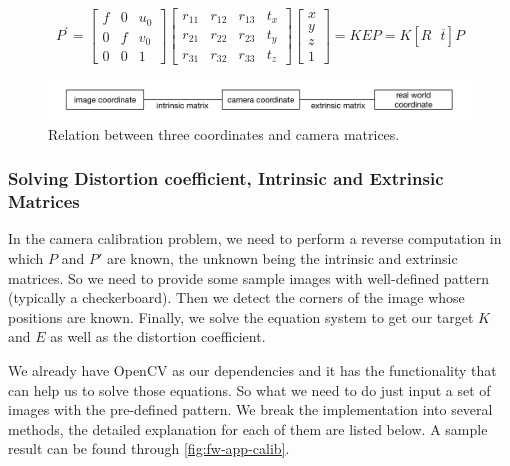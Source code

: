 \begin{equation}
\label{eq:ins-exs-mat}
P^{\prime} = \left[ \begin{array}{ccc}{f} & {0} & {u_{0}} \\ {0} & {f}
& {v_{0}} \\
{0} & {0} & {1}\end{array}\right] \left[ \begin{array}{llll}{r_{11}} & {r_{12}}
& {r_{13}} & {t_{x}} \\ {r_{21}} & {r_{22}} & {r_{23}} & {t_{y}} \\ {r_{31}} &
{r_{32}} & {r_{33}} & {t_{z}}\end{array}\right] \left[ \begin{array}{l}{x} \\
{y} \\ {z} \\ {1}\end{array}\right]
= K E P = K [R \:\:\: \overline{t}] P
\end{equation}

\begin{figure}
    \includegraphics[width=\linewidth]{figures/framework_camera_matrix.png}
    \caption{Relation between three coordinates and camera matrices.}
    \label{fig:fw-ins-exs-mat}
\end{figure}

\subsubsection{Solving Distortion coefficient, Intrinsic and Extrinsic Matrices}

In the camera calibration problem, we need to perform a reverse computation in which
$P$ and $P'$ are known, the unknown being the intrinsic and extrinsic matrices.
So we need to provide some sample images with well-defined pattern 
(typically a checkerboard). Then we detect the corners of the image whose  
positions are known. Finally, we solve the equation system to get our target 
$K$ and $E$ as well as the distortion coefficient.

We already have OpenCV as our dependencies and it has the functionality
that can help us to solve those equations. So what we need to do just input a 
set of images with the pre-defined pattern. 
We break the implementation into several methods, the detailed explanation for 
each of them are listed below. A sample result can be found through 
\autoref{fig:fw-app-calib}.

